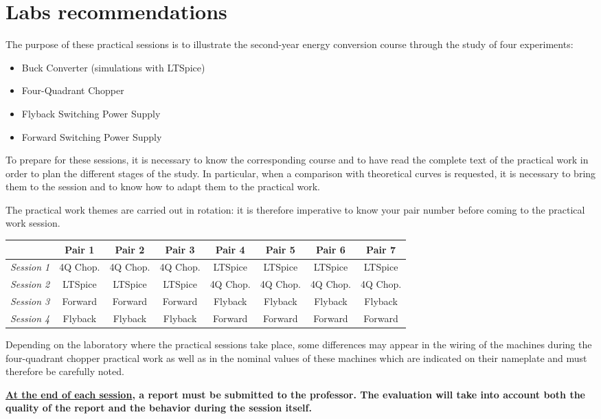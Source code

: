 \chapter{Labs recommendations}
The purpose of these practical sessions is to illustrate the second-year energy conversion course through the study of four experiments:

\begin{itemize}
\item Buck Converter (simulations with LTSpice)
\item Four-Quadrant Chopper
\item Flyback Switching Power Supply
\item Forward Switching Power Supply
\end{itemize}

To prepare for these sessions, it is necessary to know the corresponding course and to have read the complete text of the practical work in order to plan the different stages of the study. In particular, when a comparison with theoretical curves is requested, it is necessary to bring them to the session and to know how to adapt them to the practical work.

The practical work themes are carried out in rotation: it is therefore imperative to know your pair number before coming to the practical work session.

\vspace{0.5cm}
\hspace{-1cm}
\begin{tabular}{|c | c | c | c | c | c | c | c|}
\hline
& \textbf{Pair 1} & \textbf{Pair 2} & \textbf{Pair 3} & \textbf{Pair 4} & \textbf{Pair 5} & \textbf{Pair 6} & \textbf{Pair 7}\\
\hline
\textit{Session 1} & 4Q Chop. & 4Q Chop. & 4Q Chop. & LTSpice & LTSpice & LTSpice & LTSpice\\
\hline
\textit{Session 2} & LTSpice & LTSpice & LTSpice & 4Q Chop. & 4Q Chop. & 4Q Chop. & 4Q Chop.\\
\hline
\textit{Session 3} & Forward & Forward & Forward & Flyback & Flyback & Flyback & Flyback\\
\hline
\textit{Session 4} & Flyback & Flyback & Flyback & Forward & Forward & Forward & Forward\\
\hline
\end{tabular}

\vspace{0.5cm}
Depending on the laboratory where the practical sessions take place, some differences may appear in the wiring of the machines during the four-quadrant chopper practical work as well as in the nominal values of these machines which are indicated on their nameplate and must therefore be carefully noted.

\vspace{0.5cm}
\textbf{\underline{At the end of each session}, a report must be submitted to the professor. The evaluation will take into account both the quality of the report and the behavior during the session itself.}